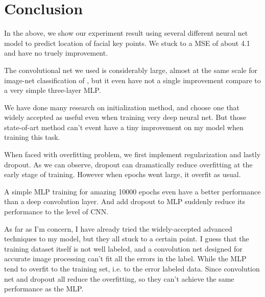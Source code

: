 \documentclass[10pt,twocolumn,letterpaper]{article}
\begin{document}
\section{Conclusion}
In the above, we show our experiment result using several different neural net model to predict
location of facial key points. We stuck to a MSE of about 4.1 and have no truely improvement.

The convolutional net we used is considerably large, almost at the same scale for image-net classification
of \cite{krizhevsky2012imagenet}, but it even have not a single improvement compare to a very simple
three-layer MLP.

We have done many research on initialization method, and choose one that widely accepted as useful even when
training very deep neural net. But those state-of-art method can't event have a tiny improvement on my model
when training this task.

When faced with overfitting problem, we first implement regularization and lastly dropout. As we can observe,
dropout can dramatically reduce overfitting at the early stage of training. However when epochs went large,
it overfit as usual.

A simple MLP training for amazing 10000 epochs even have a better performance than a deep convolution layer.
And add dropout to MLP suddenly reduce its performance to the level of CNN.

As far as I'm concern, I have already tried the widely-accepted advanced techniques to my model, but they all
stuck to a certain point. I guess that the training dataset itself is not well labeled, and a convolution net
designed for accurate image processing can't fit all the errors in the label. While the MLP tend to overfit to
the training set, i.e. to the error labeled data. Since convolution net and dropout all reduce the overfitting,
so they can't achieve the same performance as the MLP.

{\small


}
\end{document}
